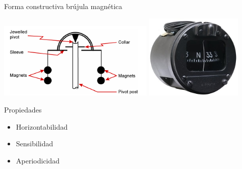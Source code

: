 \begin{frame}{Forma constructiva  br\'ujula magn\'etica}

    \begin{center}
      \includegraphics[width=0.56\textwidth]{05.instrumentos.giroscopicos.imagenes/05.04.MagnetismoTerrestre/05-04-brujula_magnetica.png}
      \qquad
\includegraphics[width=0.35\textwidth]{05.instrumentos.giroscopicos.imagenes/05.04.MagnetismoTerrestre/05-04-MagneticCompass.jpg}      
\end{center}

\begin{block}{Propiedades}

\begin{multicols}{3}
    \begin{itemize}
         \item Horizontabilidad
         \item Sensibilidad
         \item Aperiodicidad
    \end{itemize}
\end{multicols}
\end{block}

\end{frame}

